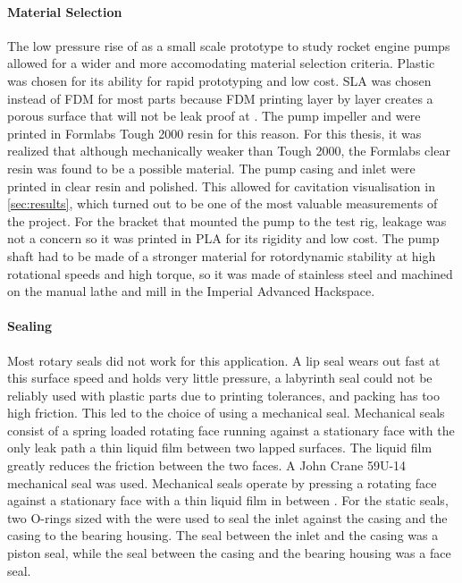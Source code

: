 
\paragraph{Material Selection} The low pressure rise of \valPumpPressureDesign as a small scale prototype to study rocket engine pumps allowed for a wider and more accomodating material selection criteria. Plastic was chosen for its ability for rapid prototyping and low cost. SLA was chosen instead of FDM for most parts because FDM printing layer by layer creates a porous surface that will not be leak proof at \valPumpPressureDesign. The pump impeller and were printed in Formlabs Tough 2000 resin for this reason. For this thesis, it was realized that although mechanically weaker than Tough 2000, the Formlabs clear resin was found to be a possible material. The pump casing and inlet were printed in clear resin and polished. This allowed for cavitation visualisation in \cref{sec:results}, which turned out to be one of the most valuable measurements of the project. For the bracket that mounted the pump to the test rig, leakage was not a concern so it was printed in PLA for its rigidity and low cost. The pump shaft had to be made of a stronger material for rotordynamic stability at high rotational speeds and high torque, so it was made of stainless steel and machined on the manual lathe and mill in the Imperial Advanced Hackspace.

\paragraph{Sealing} Most rotary seals did not work for this application. A lip seal wears out fast at this surface speed and holds very little pressure, a labyrinth seal could not be reliably used with plastic parts due to printing tolerances, and packing has too high friction. This led to the choice of using a mechanical seal. Mechanical seals consist of a spring loaded rotating face running against a stationary face with the only leak path a thin liquid film between two lapped surfaces. The liquid film greatly reduces the friction between the two faces. A John Crane 59U-14 mechanical seal was used. Mechanical seals operate by pressing a rotating face against a stationary face with a thin liquid film in between \cite{karassikPumpHandbook2008}. For the static seals, two O-rings sized with the \cite{ParkerORingHandbook} were used to seal the inlet against the casing and the casing to the bearing housing. The seal between the inlet and the casing was a piston seal, while the seal between the casing and the bearing housing was a face seal.

